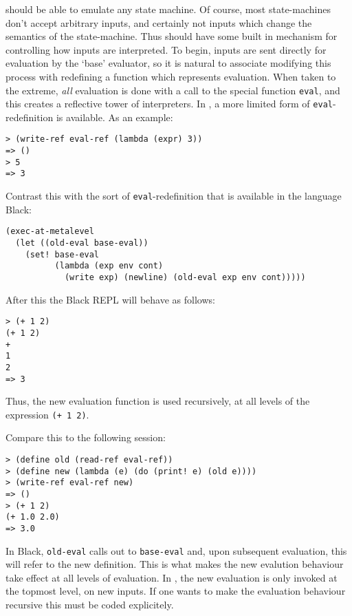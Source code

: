 \rad{} should be able to emulate any state machine. Of course, most state-machines
don't accept arbitrary inputs, and certainly not inputs which change the
semantics of the state-machine. Thus \rad{} should have some built in mechanism
for controlling how inputs are interpreted. To begin, inputs are sent
directly for evaluation by the `base' evaluator, so it is natural to associate
modifying this process with redefining a function which represents evaluation.
When taken to the extreme, \emph{all} evaluation is done with a call to the
special function \texttt{eval}, and this creates a reflective tower of
interpreters. In \rad{}, a more limited form of \texttt{eval}-redefinition is
available. As an example:
\bigskip
\begin{Verbatim}
> (write-ref eval-ref (lambda (expr) 3))
=> ()
> 5
=> 3
\end{Verbatim}
Contrast this with the sort of \texttt{eval}-redefinition that is available in
the language Black\cite{Asai1997}:
\begin{lstlisting}
(exec-at-metalevel
  (let ((old-eval base-eval))
    (set! base-eval
          (lambda (exp env cont)
            (write exp) (newline) (old-eval exp env cont)))))
\end{lstlisting}
After this the Black REPL will behave as follows:
\bigskip
\begin{Verbatim}
> (+ 1 2)
(+ 1 2)
+
1
2
=> 3
\end{Verbatim}
Thus, the new evaluation function is used recursively, at all levels of the
expression \texttt{(+ 1 2)}.

Compare this to the following \rad{} session:
\bigskip
\begin{Verbatim}
> (define old (read-ref eval-ref))
> (define new (lambda (e) (do (print! e) (old e))))
> (write-ref eval-ref new)
=> ()
> (+ 1 2)
(+ 1.0 2.0)
=> 3.0
\end{Verbatim}
In Black, \texttt{old-eval} calls out to
\texttt{base-eval} and, upon subsequent evaluation, this will refer to the new
definition. This is what makes the new evalution behaviour take effect at all
levels of evaluation. In \rad{}, the new evaluation is only invoked at the
topmost level, on new inputs. If one wants to make the evaluation behaviour
recursive this must be coded explicitely.

